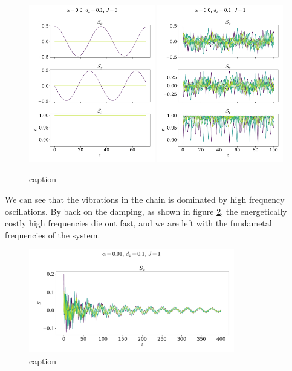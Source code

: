 \documentclass{article}
\begin{document}
    \begin{figure}
        \centering
        \includegraphics[width=0.49\textwidth]{../plots/2221.pdf}
        \includegraphics[width=0.49\textwidth]{../plots/2222.pdf}
        \caption{caption}
        \label{one tilted}
    \end{figure}

    We can see that the vibrations in the chain is dominated by high frequency oscillations. By back on the damping, as shown in figure \ref{one tilted dampend}, the energetically costly high frequencies die out fast, and we are left with the fundametal frequencies of the system.    

    \begin{figure}
        \centering
        \includegraphics[width=0.8\textwidth]{../plots/2224.pdf}
        \caption{caption}
        \label{one tilted dampend}
    \end{figure}


    
    
\end{document}

